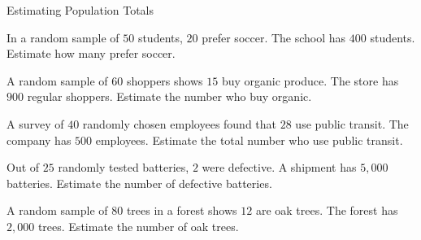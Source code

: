 \begin{practiceBox}{Estimating Population Totals}


\prob In a random sample of $50$ students, $20$ prefer soccer. The school has $400$ students. Estimate how many prefer soccer. \answerBlank[3cm]

\prob A random sample of $60$ shoppers shows $15$ buy organic produce. The store has $900$ regular shoppers. Estimate the number who buy organic. \answerBlank[3cm]

\prob A survey of $40$ randomly chosen employees found that $28$ use public transit. The company has $500$ employees. Estimate the total number who use public transit. \answerBlank[3cm]

\prob Out of $25$ randomly tested batteries, $2$ were defective. A shipment has $5{,}000$ batteries. Estimate the number of defective batteries. \answerBlank[3cm]

\prob A random sample of $80$ trees in a forest shows $12$ are oak trees. The forest has $2{,}000$ trees. Estimate the number of oak trees. \answerBlank[3cm]

\end{practiceBox}

